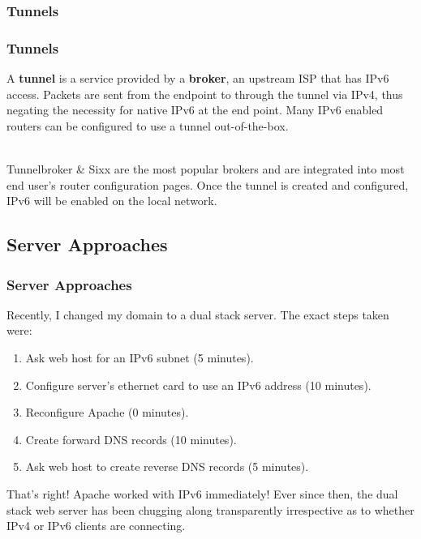 \documentclass[aspectratio=169]{beamer}
\begin{document}
\subsubsection{Tunnels}
\begin{frame}
\frametitle{Tunnels}
A \textbf{tunnel} is a service provided by a \textbf{broker}, an upstream ISP that has IPv6 access. Packets are sent from the endpoint to through the tunnel via IPv4, thus negating the necessity for native IPv6 at the end point. Many IPv6 enabled routers can be configured to use a tunnel out-of-the-box.

\pause
\mbox{}\\
Tunnelbroker \& Sixx are the most popular brokers and are integrated into most end user's router configuration pages. Once the tunnel is created and configured, IPv6 will be enabled on the local network.
\end{frame}

\subsection{Server Approaches}
\begin{frame}
\frametitle{Server Approaches}
Recently, I changed my domain to a dual stack server. The exact steps taken were:
\begin{enumerate}
	\item Ask web host for an IPv6 subnet (5 minutes).
	\pause
	\item Configure server's ethernet card to use an IPv6 address (10 minutes).
	\pause
	\item Reconfigure Apache (0 minutes).
	\pause
	\item Create forward DNS records (10 minutes).
	\pause
	\item Ask web host to create reverse DNS records (5 minutes).
	\pause
\end{enumerate}
That's right! Apache worked with IPv6 immediately! Ever since then, the dual stack web server has been chugging along transparently irrespective as to whether IPv4 or IPv6 clients are connecting.
\end{frame}
\end{document}
